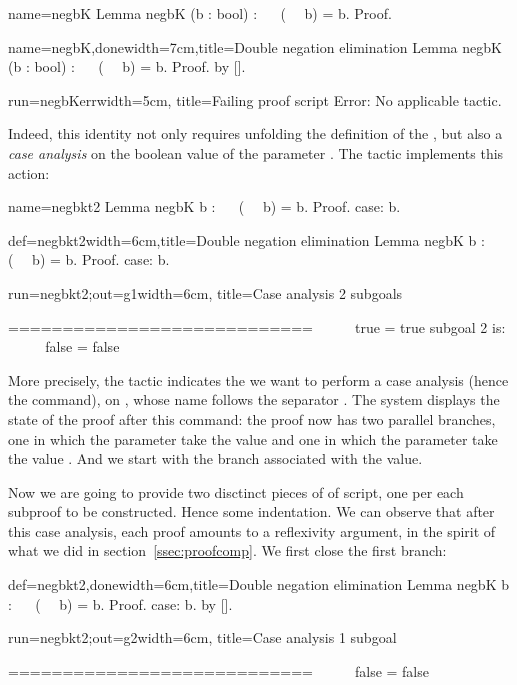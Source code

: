 \begin{coqdef}{name=negbK}
Lemma negbK (b : bool) : ~~ (~~ b) = b.
Proof.
\end{coqdef}
\begin{coq}{name=negbK,done}{width=7cm,title=Double negation elimination}
Lemma negbK (b : bool) : ~~ (~~ b) = b.
Proof. by [].
\end{coq}
\begin{coqout}{run=negbKerr}{width=5cm, title=Failing proof script}
Error: No applicable tactic.
\end{coqout}

Indeed, this identity not only requires unfolding the definition of
the , but also a \emph{case analysis} on the boolean value of
the parameter . The tactic  implements this action:

\begin{coqdef}{name=negbkt2}
Lemma negbK b : ~~ (~~ b) = b.
Proof.
case: b.
\end{coqdef}
\begin{coq}{def=negbkt2}{width=6cm,title=Double negation elimination}
Lemma negbK b : ~~ (~~ b) = b.
Proof.
case: b.
$~$
$~$
$~$
\end{coq}
\begin{coqout}{run=negbkt2;out=g1}{width=6cm, title=Case analysis}
2 subgoals

  ============================
   ~~ ~~ true = true
subgoal 2 is:
 ~~ ~~ false = false
\end{coqout}

More precisely, the tactic  indicates the we want to
perform a case analysis (hence the  command), on , whose
name follows the separator \C{:}. The \Coq{} system displays the state
of the proof after this command: the proof now has two parallel
branches, one in which the parameter  take the value  and
one in which the parameter  take the value . And we
start with the branch associated with the  value.

Now we are going to provide two disctinct pieces of of script, one per
each subproof to be constructed. Hence some indentation. We can
observe that after this case analysis, each proof amounts to a
reflexivity argument, in the spirit of what we did in
section~\ref{ssec:proofcomp}. We first close the first branch:

\begin{coq}{def=negbkt2,done}{width=6cm,title=Double negation elimination}
Lemma negbK b : ~~ (~~ b) = b.
Proof.
case: b.
  by [].
\end{coq}
\begin{coqout}{run=negbkt2;out=g2}{width=6cm, title=Case analysis}
1 subgoal

 ============================
   ~~ ~~ false = false
\end{coqout}

